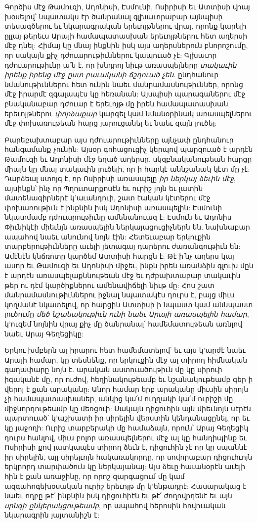 \documentclass{article}
\begin{document}
{Գործիս մէջ Թամուզի, Ադոնիսի, Էսմունի, Ոսիրիսի եւ Ատտիսի վրայ խօսելով՝ նպատակս էր ծանրանալ գլխաւորաբար այնպիսի տեսագծերու եւ նկարագրական երեւոյթներու վրայ, որոնք կարելի ըլլայ թերեւս Արայի համապատասխան երեւոյթներու հետ աղերսի մէջ դնել: Հիմայ կը մնայ ինքնին իսկ այս աղերսներուն բնորոշումը, որ սակայն քիչ դժուարութիւններու կապուած չէ: Գլխաւոր դժուարութիւնը ա՛ն է, որ խնդրոյ նիւթ առասպելները \emph{տակաւին իրենք իրենց մէջ ըստ բաւականի ճշդուած չեն}. ընդհանուր նմանութիւններու հետ ունին նաեւ մանրամասնութիւններ, որոնց մէջ իրարմէ զգալապէս կը հեռանան: Այսպիսի պարագաներու մէջ բնականաբար դժուար է երեւոյթ մը իրեն համապատասխան երեւոյթներու \emph{փորձաքար} կարգել կամ նմանօրինակ առասպելներու մէջ փոխառութեան հարց յարուցանել եւ նաեւ զայն լուծել:

Բարեբախտաբար այս դժուարութիւնները այնչափ ընդհանուր հանգամանք չունին: Այսօր գոհացուցիչ կերպով պարզուած է արդէն Թամուզի եւ Ադոնիսի մէջ եղած աղերսը. սկզբնականութեան հարցը միայն կը մնայ տակաւին լուծելի, որ ի հարկէ աննշանակ կէտ մը չէ: Դարձեալ ստոյգ է, որ Ոսիրիսի առասպելը \emph{իր ներկայ ձեւին մէջ}, այսինքն՝ ինչ որ Պղուտարքոսէն եւ ուրիշ յոյն եւ լատին մատենագիրներէ կ'աւանդուի, շատ էական կէտերու մէջ փոխառութիւն է ինքնին իսկ Ադոնիսի առասպելին: Էսմունի նկատմամբ դժուարութիւնը ամենանուազ է: Էսմուն եւ Ադոնիս Փիւնիկէի միեւնյն առասպելին ներկայացուցիչներն են. նախնաբար ապահով նաեւ անունով նոյն էին: Հետեւաբար երկուքին տարբերութիւնները աւելի յետագայ դարերու ժառանգութիւն են: Ամէնէն կնճռոտը կարծեմ Ատտիսի հարցն է: Թէ ի՛նչ աղերս կայ ասոր եւ Թամուզի եւ Ադոնիսի միջեւ, ինքն իրեն առանձին գլուխ մըն է արդէն առասպելաքննութեան մէջ եւ դժբախտաբար տակաւին թեր ու դէմ կարծիքներու ամենավիճելի նիւթ մը: Հոս շատ մանրամասնութիւններու իջնալ նպատակէս դուրս է, բայց միւս կողմանէ նկատելով, որ հարցին Ատտիսի ի նպաստ կամ աննպաստ լուծումը \emph{մեծ նշանակութիւն ունի նաեւ Արայի առասպելին համար}, կ'ուզեմ նոյնին վրայ քիչ մը ծանրանալ՝ համեմատութեան առնլով նաեւ Արայ Գեղեցիկը:

Երկու խմբերն ալ իրարու հետ համեմատելով՝ եւ այս կ'արժէ նաեւ Արայի համար, կը տեսնենք, որ երկուքին մէջ ալ տիրող հիմնական գաղափարը նոյն է. արական աստուածութիւն մը կը սիրուի իգականէ մը, որ ուժով, հեղինակութեամբ եւ նշանակութեամբ գեր ի վերոյ է քան արականը: Անոր համար երբ արականը միւսին սիրոյն չի համապատասխաներ, անկից կա՛մ ուղղակի կա՛մ ուրիշի մը միջնորդութեամբ կը մեռցուի: Սակայն դիցուհին այն միեւնոյն սէրէն պարտուած՝ կ'աշխատի իր սիրելին վերստին կենդանացընել, որ եւ կը յաջողի: Ուրիշ տարբերակի մը համաձայն, որուն՝ Արայ Գեղեցիկ դուրս հանլով, միւս բոլոր առասպելներու մէջ ալ կը հանդիպինք եւ Ոսիրիսի քով յատկապէս տիրող ձեւն է, դիցուհին չէ որ կը սպաննէ իր սիրելին, այլ սիրելւոյն հակառակորդը, որ սովորաբար դիցուհւոյն երկրորդ տարփածուն կը ներկայանայ: Այս ձեւը հաւանօրէն աւեյի հին է քան առաջինը, որ որոշ զարգացում մը կամ ազգահոգեխօսական ուրիշ երեւոյթ մը կ'ենթադրէ: Հասարակաց է նաեւ ողբը թէ՛ ինքնին իսկ դիցուհիէն եւ թէ՛ ժողովրդենէ եւ այն \emph{սրնգի ընկերակցութեամբ}, որ ապահով հերոսին հովուական նկարագրին յայտանիշն է:

}
\end{document}
